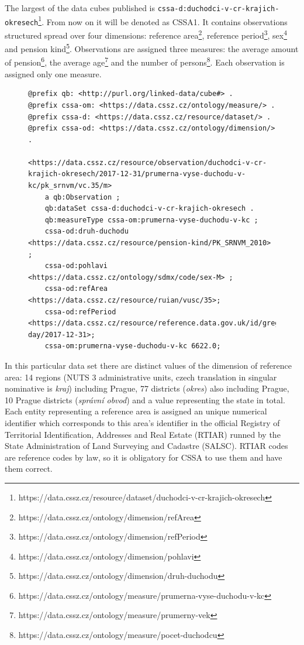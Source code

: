 
The largest of the data cubes published is \verb|cssa-d:duchodci-v-cr-krajich-okresech|\footnote{https://data.cssz.cz/resource/dataset/duchodci-v-cr-krajich-okresech}. From now on it will be denoted as CSSA1. It contains  observations structured spread over four dimensions: reference area\footnote{https://data.cssz.cz/ontology/dimension/refArea}, reference period\footnote{https://data.cssz.cz/ontology/dimension/refPeriod}, sex\footnote{https://data.cssz.cz/ontology/dimension/pohlavi} and pension kind\footnote{https://data.cssz.cz/ontology/dimension/druh-duchodu}. Observations are assigned three measures: the average amount of pension\footnote{https://data.cssz.cz/ontology/measure/prumerna-vyse-duchodu-v-kc}, the average age\footnote{https://data.cssz.cz/ontology/measure/prumerny-vek} and the number of persons\footnote{https://data.cssz.cz/ontology/measure/pocet-duchodcu}. Each observation is assigned only one measure.

\begin{figure}[h]
\begin{lstlisting}[language = turtle, caption={Example of an observation from CSSA1}, label={cssa1example},captionpos=b escapeinside={(*@}{@*)}]
@prefix qb: <http://purl.org/linked-data/cube#> .
@prefix cssa-om: <https://data.cssz.cz/ontology/measure/> .
@prefix cssa-d: <https://data.cssz.cz/resource/dataset/> .
@prefix cssa-od: <https://data.cssz.cz/ontology/dimension/> .

<https://data.cssz.cz/resource/observation/duchodci-v-cr-krajich-okresech/2017-12-31/prumerna-vyse-duchodu-v-kc/pk_srnvm/vc.35/m>
    a qb:Observation ;
    qb:dataSet cssa-d:duchodci-v-cr-krajich-okresech .
    qb:measureType cssa-om:prumerna-vyse-duchodu-v-kc ;
    cssa-od:druh-duchodu <https://data.cssz.cz/resource/pension-kind/PK_SRNVM_2010> ;
    cssa-od:pohlavi <https://data.cssz.cz/ontology/sdmx/code/sex-M> ;
    cssa-od:refArea <https://data.cssz.cz/resource/ruian/vusc/35>;
    cssa-od:refPeriod <https://data.cssz.cz/resource/reference.data.gov.uk/id/gregorian-day/2017-12-31>;
    cssa-om:prumerna-vyse-duchodu-v-kc 6622.0;
\end{lstlisting}
\end{figure}

In this particular data set there are  distinct values of the dimension of reference area: 14 regions (NUTS 3 administrative units, czech translation in singular nominative is \textit{kraj}) including Prague, 77 districts (\textit{okres}) also including Prague, 10 Prague districts (\textit{správní obvod}) and a value representing the state in total. Each entity representing a reference area is assigned an unique numerical identifier which corresponds to this area's identifier in the official Registry of Territorial Identification, Addresses and Real Estate (RTIAR) runned by the State Administration of Land Surveying and Cadastre (SALSC). RTIAR codes are reference codes by law, so it is obligatory for CSSA to use them and have them correct.

